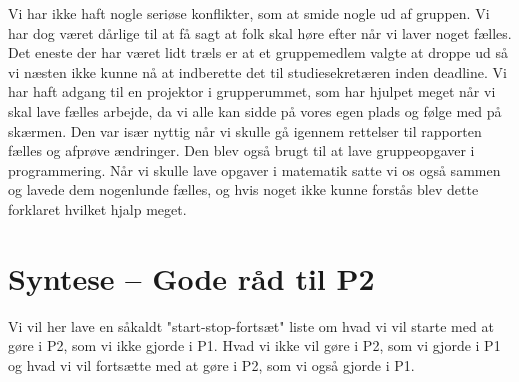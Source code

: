 \documentclass[oneside,a4paper,titlepage]{article}
\begin{document}
Vi har ikke haft nogle seriøse konflikter, som at smide nogle ud af gruppen. Vi har dog været dårlige til at få sagt at folk skal høre efter når vi laver noget fælles. Det eneste der har været lidt træls er at et gruppemedlem valgte at droppe ud så vi næsten ikke kunne nå at indberette det til studiesekretæren inden deadline. \newline\newline
Vi har haft adgang til en projektor i grupperummet, som har hjulpet meget når vi skal lave fælles arbejde, da vi alle kan sidde på vores egen plads og følge med på skærmen. Den var især nyttig når vi skulle gå igennem rettelser til rapporten fælles og afprøve ændringer. Den blev også brugt til at lave gruppeopgaver i programmering. Når vi skulle lave opgaver i matematik satte vi os også sammen og lavede dem nogenlunde fælles, og hvis noget ikke kunne forstås blev dette forklaret hvilket hjalp meget. 


\section{Syntese – Gode råd til P2}
Vi vil her lave en såkaldt "start-stop-fortsæt" liste om hvad vi vil starte med at gøre i P2, som vi ikke gjorde i P1. Hvad vi ikke vil gøre i P2, som vi gjorde i P1 og hvad vi vil fortsætte med at gøre i P2, som vi også gjorde i P1.
\end{document}
